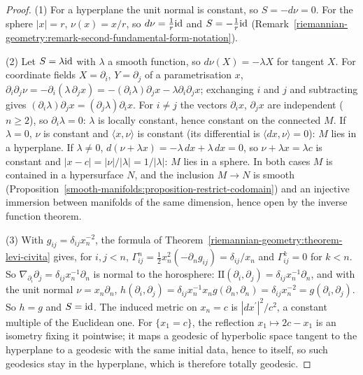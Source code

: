 \begin{proof}
(1) For a hyperplane the unit normal is constant, so $S = -d\nu = 0$. For the sphere $|x| = r$, $\nu(x) = x/r$, so $d\nu = \frac1r\mathrm{id}$ and $S = -\frac1r\mathrm{id}$
(Remark~\ref{riemannian-geometry:remark-second-fundamental-form-notation}).

(2) Let $S = \lambda\mathrm{id}$ with $\lambda$ a smooth function, so $d\nu(X) = -\lambda X$ for tangent $X$. For coordinate fields $X = \partial_i$, $Y = \partial_j$ of a parametrisation $x$,
$\partial_i\partial_j\nu = -\partial_i(\lambda\,\partial_jx) = -(\partial_i\lambda)\partial_jx - \lambda\partial_i\partial_jx$; exchanging $i$ and $j$ and subtracting gives
$(\partial_i\lambda)\partial_jx = (\partial_j\lambda)\partial_ix$. For $i \neq j$ the vectors $\partial_ix$, $\partial_jx$ are independent ($n \geq 2$), so $\partial_i\lambda = 0$: $\lambda$ is locally constant,
hence constant on the connected $M$. If $\lambda = 0$, $\nu$ is constant and $\langle x, \nu\rangle$ is constant (its differential is $\langle dx, \nu\rangle = 0$): $M$ lies in a hyperplane. If $\lambda \neq 0$,
$d(\nu + \lambda x) = -\lambda\,dx + \lambda\,dx = 0$, so $\nu + \lambda x = \lambda c$ is constant and $|x - c| = |\nu|/|\lambda| = 1/|\lambda|$: $M$ lies in a sphere. In both cases $M$ is contained in a hypersurface $N$, and the inclusion
$M \to N$ is smooth (Proposition~\ref{smooth-manifolds:proposition-restrict-codomain}) and an injective immersion between manifolds of the same dimension, hence open by the inverse function theorem.

(3) With $g_{ij} = \delta_{ij}x_n^{-2}$, the formula of Theorem~\ref{riemannian-geometry:theorem-levi-civita} gives, for $i, j < n$, $\Gamma^n_{ij} = \frac12x_n^2(-\partial_ng_{ij}) = \delta_{ij}/x_n$ and
$\Gamma^k_{ij} = 0$ for $k < n$. So $\nabla_{\partial_i}\partial_j = \delta_{ij}x_n^{-1}\partial_n$ is normal to the horosphere: $\mathrm{II}(\partial_i, \partial_j) = \delta_{ij}x_n^{-1}\partial_n$, and with the unit
normal $\nu = x_n\partial_n$, $h(\partial_i, \partial_j) = \delta_{ij}x_n^{-1}x_ng(\partial_n, \partial_n) = \delta_{ij}x_n^{-2} = g(\partial_i, \partial_j)$. So $h = g$ and $S = \mathrm{id}$. The induced metric on
$x_n = c$ is $|dx^{\prime}|^2/c^2$, a constant multiple of the Euclidean one. For $\{x_1 = c\}$, the reflection $x_1 \mapsto 2c - x_1$ is an isometry fixing it pointwise; it maps a geodesic of
hyperbolic space tangent to the hyperplane to a geodesic with the same initial data, hence to itself, so such geodesics stay in the hyperplane, which is therefore totally geodesic.
\end{proof}

